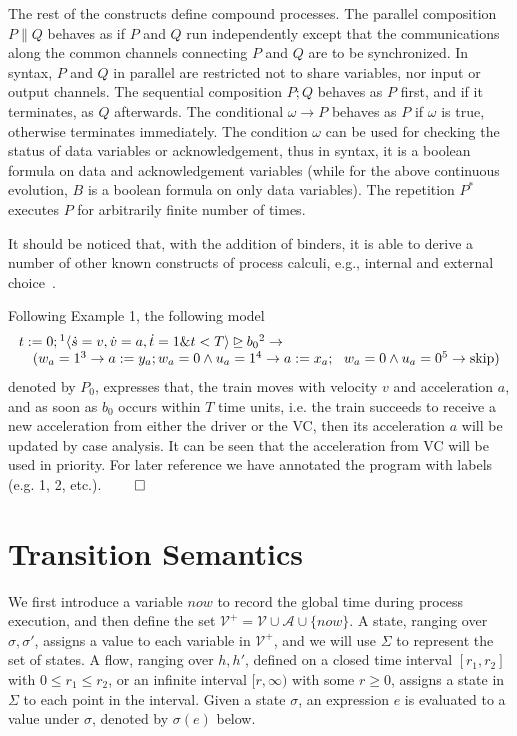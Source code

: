 \documentclass{llncs}
\newcommand{\pskip}{\textmd{skip}}
\begin{document}
The rest of the  constructs define compound processes. The parallel composition $P\|Q$
behaves as if $P$ and $Q$ run independently
except that the communications along the common channels connecting $P$ and $Q$ are to be synchronized.
In syntax, $P$ and $Q$ in parallel are restricted not to
share variables, nor input or output channels.
The sequential composition $P; Q$ behaves as $P$ first, and if it terminates, as $Q$ afterwards.
The conditional $\omega \rightarrow P$ behaves as $P$ if $\omega$ is true, otherwise terminates immediately. The condition $\omega$ can be used for 
checking the status of data variables or acknowledgement, thus in syntax,
it is a boolean formula on data and acknowledgement variables (while for
the above continuous evolution,  $B$ is a boolean formula on only data variables). The
repetition $P^*$ executes $P$ for arbitrarily finite number of times.

It should be noticed that, with the addition of binders, it is able to derive a number of other
known constructs of process calculi, e.g., internal
and external choice~\cite{RNV12}.



\example
Following Example 1,  the following model
\[
\begin{array}{l}
t:=0; {}^1 \langle \dot{s} = v, \dot{v} = a, \dot{t} = 1 \& t<T \rangle \unrhd b_0 {}^2\rightarrow \\
\quad ( w_a=1{}^3 \rightarrow a:=y_a; w_a = 0 \wedge u_a = 1{}^4 \rightarrow a:=x_a;
 \ \ w_a = 0 \wedge u_a = 0{}^5 \rightarrow \pskip)
\end{array}
\]
denoted by $P_0$, expresses that, the train moves with velocity $v$ and acceleration $a$, and as soon as $b_0$ occurs within $T$ time units, i.e.
 the train succeeds to receive a new acceleration from either the driver or the VC,
 then its acceleration $a$ will be updated by case analysis. It can be seen that the acceleration from VC will be used in priority.
For later reference we have annotated the program with labels (e.g. 1, 2, etc.). $\qed$










  \section{Transition Semantics}
\label{sec:semantics}
We first introduce a variable $now$ to record the global time during process execution, and then
define the set $\mathcal{V}^+= \mathcal{V} \cup \mathcal{A} \cup \{now\}$.
A state, ranging over $\sigma, \sigma'$,  assigns a value to each variable in
$\mathcal{V} ^+$, and we will use $\Sigma$ to represent the set of states.
A flow, ranging over $h, h'$, defined on a closed time interval $[r_1, r_2]$ with $0 \leq r_1 \leq r_2$,
or an infinite interval $[r, \infty)$ with some $r \geq 0$,
assigns a state in $\Sigma$ to each point in the interval.
Given a state $\sigma$, an expression $e$ is evaluated to a value under $\sigma$, denoted by $\sigma(e)$ below.
\end{document}
